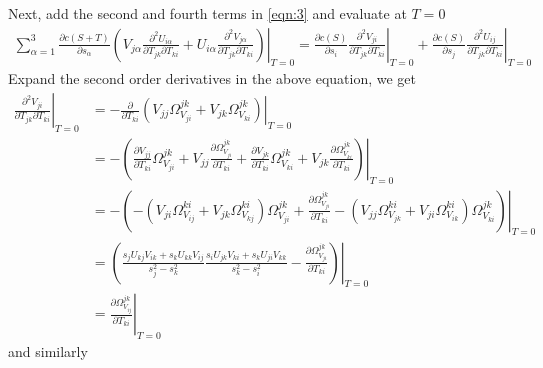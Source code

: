 \documentclass[10pt]{article}
\begin{document}
Next, add the second and fourth terms in \eqref{eqn:3} and evaluate at $T=0$
\begin{align}
	\sum_{\alpha=1}^3 \frac{\partial c(S+T)}{\partial s_\alpha} \left.\left( V_{j\alpha}\frac{\partial^2 U_{i\alpha}}{\partial T_{jk} \partial T_{ki}} + U_{i\alpha}\frac{\partial^2 V_{j\alpha}}{\partial T_{jk} \partial T_{ki}} \right)\right|_{T=0} = \left. \frac{\partial c(S)}{\partial s_i} \frac{\partial^2 V_{ji}}{\partial T_{jk} \partial T_{ki}} \right|_{T=0} + \left. \frac{\partial c(S)}{\partial s_j} \frac{\partial^2 U_{ij}}{\partial T_{jk} \partial T_{ki}} \right|_{T=0}
\end{align}
Expand the second order derivatives in the above equation, we get
\begin{align}
	\left. \frac{\partial^2 V_{ji}}{\partial T_{jk} \partial T_{ki}} \right|_{T=0} &= -\left. \frac{\partial}{\partial T_{ki}} \left( V_{jj}\Omega_{V_{ji}}^{jk} + V_{jk}\Omega_{V_{ki}}^{jk} \right) \right|_{T=0} \nonumber \\
	&= -\left.\left( \frac{\partial V_{jj}}{\partial T_{ki}}\Omega_{V_{ji}}^{jk} + V_{jj}\frac{\partial \Omega_{V_{ji}}^{jk}}{\partial T_{ki}} + \frac{\partial V_{jk}}{\partial T_{ki}}\Omega_{V_{ki}}^{jk} + V_{jk}\frac{\partial \Omega_{V_{ki}}^{jk}}{\partial T_{ki}} \right)\right|_{T=0} \nonumber \\
	&= -\left.\left( -\left( V_{ji}\Omega_{V_{ij}}^{ki} + V_{jk}\Omega_{V_{kj}}^{ki} \right)\Omega_{V_{ji}}^{jk} + \frac{\partial \Omega_{V_{ji}}^{jk}}{\partial T_{ki}} - \left( V_{jj}\Omega_{V_{jk}}^{ki} + V_{ji}\Omega_{V_{ik}}^{ki} \right)\Omega_{V_{ki}}^{jk} \right)\right|_{T=0} \nonumber \\
	&= \left.\left( \frac{s_jU_{kj}V_{ik} + s_kU_{kk}V_{ij}}{s_j^2-s_k^2} \frac{s_iU_{jk}V_{ki} + s_kU_{ji}V_{kk}}{s_k^2-s_i^2} - \frac{\partial \Omega_{V_{ji}}^{jk}}{\partial T_{ki}} \right)\right|_{T=0} \nonumber \\
	&= \left. \frac{\partial \Omega_{V_{ij}}^{jk}}{\partial T_{ki}} \right|_{T=0}
\end{align}
and similarly
\end{document}
